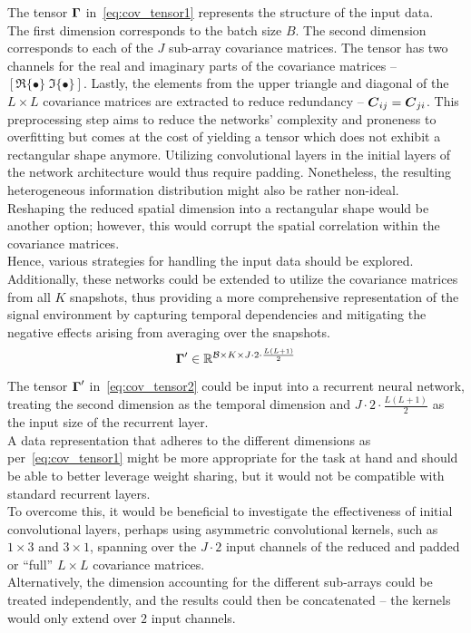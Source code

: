 The tensor \( \boldsymbol{\Gamma} \) in~\autoref{eq:cov_tensor1} represents the structure of the input data. \\
The first dimension corresponds to the batch size \( B \).
The second dimension corresponds to each of the \( J \) sub-array covariance matrices.
The tensor has two channels for the real and imaginary parts of the covariance matrices --
\( \left[ \Re\{\bullet\} \; \Im\{\bullet\} \right] \).
Lastly, the elements from the upper triangle and diagonal of the \(L \times L\) covariance matrices are extracted to reduce redundancy -- \( \boldsymbol{C}_{ij} = \boldsymbol{C}_{ji} \).
This preprocessing step aims to reduce the networks' complexity and proneness to overfitting but comes at the cost of yielding
a tensor which does not exhibit a rectangular shape anymore. Utilizing convolutional layers in the initial layers of the network architecture
would thus require padding. Nonetheless, the resulting heterogeneous information distribution might also be rather non-ideal. \\
Reshaping the reduced spatial dimension into a rectangular shape would be another option; however,
this would corrupt the spatial correlation within the covariance matrices. \\
Hence, various strategies for handling the input data should be explored. \\
Additionally, these networks could be extended to utilize the covariance matrices from all \( K \) snapshots, thus providing
a more comprehensive representation of the signal environment by capturing temporal dependencies and mitigating the negative
effects arising from averaging over the snapshots. \\

\begin{equation}
    \boldsymbol{\Gamma}' \in \mathbb{R}^{\mathcal{B} \times K \times J \cdot 2 \cdot \frac{L(L+1)}{2}}
    \label{eq:cov_tensor2}
\end{equation}

The tensor \( \boldsymbol{\Gamma}' \) in~\autoref{eq:cov_tensor2} could be input into a recurrent neural network, treating
the second dimension as the temporal dimension and \( J \cdot 2 \cdot \frac{L(L+1)}{2} \) as the input size of the
recurrent layer. \\
A data representation that adheres to the different dimensions as per~\autoref{eq:cov_tensor1} might be more appropriate
for the task at hand and should be able to better leverage weight sharing, but it would not be compatible with standard recurrent layers.\\
To overcome this, it would be beneficial to investigate the effectiveness of initial convolutional layers, perhaps using
asymmetric convolutional kernels, such as \( 1 \times 3 \) and \( 3 \times 1 \), spanning over the \( J \cdot 2 \) input
channels of the reduced and padded or ``full'' \( L \times L \) covariance matrices. \\
Alternatively, the dimension accounting for the different sub-arrays could be treated independently, and the
results could then be concatenated -- the kernels would only extend over \( 2 \) input channels.

